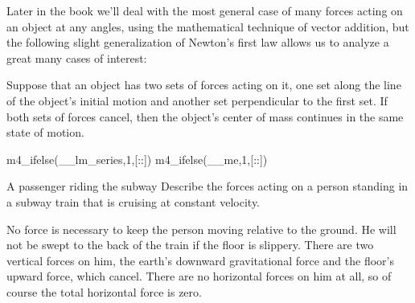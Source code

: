 Later in the book we'll deal with the most general case of
many forces acting on an object at any angles, using the
mathematical technique of vector addition, but the following
slight generalization of Newton's first law allows us to
analyze a great many cases of interest:

Suppose that an object has two sets of forces acting on it,
one set along the line of the object's initial motion and
another set perpendicular to the first set. If both sets of
forces cancel, then the object's center of mass continues in
the same state of motion.

m4_ifelse(__lm_series,1,[:\pagebreak[4]:])
m4_ifelse(__me,1,[:\pagebreak[4]:])

\begin{eg}{A passenger riding the subway}
\egquestion Describe the forces acting on a person standing in
a subway train that is cruising at constant velocity.

\eganswer No force is necessary to keep the person moving
relative to the ground. He will not be swept to the back of
the train if the floor is slippery. There are two vertical
forces on him, the earth's downward gravitational force and
the floor's upward force, which cancel. There are no
horizontal forces on him at all, so of course the total
horizontal force is zero.
\end{eg}


